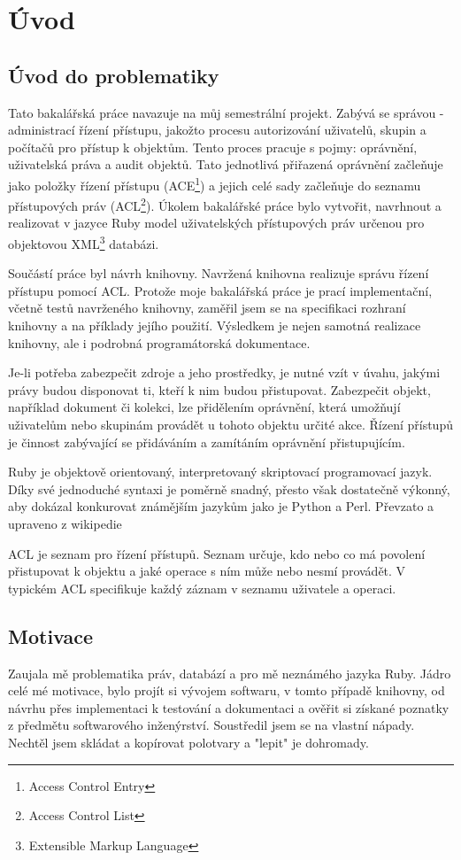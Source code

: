 \chapter{Úvod}

\section{Úvod do problematiky}

Tato bakalářská práce navazuje na můj semestrální projekt. Zabývá se správou - administrací řízení přístupu, jakožto procesu autorizování uživatelů, skupin a počítačů pro přístup k objektům. Tento proces pracuje s pojmy: oprávnění, uživatelská práva a audit objektů. Tato jednotlivá přiřazená oprávnění začleňuje jako položky řízení přístupu (ACE\footnote[1]{Access Control Entry}) a jejich celé sady začleňuje do seznamu přístupových práv (ACL\footnote[2]{Access Control List}). Úkolem bakalářské práce bylo vytvořit, navrhnout a realizovat v jazyce Ruby model uživatelských přístupových práv určenou pro objektovou XML\footnote[3]{Extensible Markup Language} databázi.

Součástí práce byl návrh knihovny. Navržená knihovna realizuje správu řízení přístupu pomocí ACL. Protože moje bakalářská práce je prací implementační, včetně testů navrženého knihovny, zaměřil jsem se na specifikaci rozhraní knihovny a na příklady jejího použití. Výsledkem je nejen samotná realizace knihovny, ale i podrobná programátorská dokumentace.

Je-li potřeba zabezpečit zdroje a jeho prostředky, je nutné vzít v úvahu, jakými právy budou disponovat ti, kteří k nim budou přistupovat. Zabezpečit objekt, například dokument či kolekci, lze přidělením oprávnění, která umožňují uživatelům nebo skupinám provádět u tohoto objektu určité akce. Řízení přístupů je činnost zabývající se přidáváním a zamítáním oprávnění přistupujícím.

Ruby je objektově orientovaný, interpretovaný skriptovací programovací jazyk. Díky své jednoduché syntaxi je poměrně snadný, přesto však dostatečně výkonný, aby dokázal konkurovat známějším jazykům jako je Python a Perl. Převzato a upraveno z wikipedie\cite{wiki:Ruby}

ACL je seznam pro řízení přístupů. Seznam určuje, kdo nebo co má povolení přistupovat k objektu a jaké operace s ním může nebo nesmí provádět. V typickém ACL specifikuje každý záznam v seznamu uživatele a operaci\cite{wiki:acl}.


\section{Motivace}
Zaujala mě problematika práv, databází a pro mě neznámého jazyka Ruby.
Jádro celé mé motivace, bylo projít si vývojem softwaru, v tomto případě knihovny, od návrhu přes implementaci k testování a dokumentaci a ověřit si získané poznatky z předmětu softwarového inženýrství. Soustředil jsem se na vlastní nápady. Nechtěl jsem skládat a kopírovat polotvary a "lepit" je dohromady.